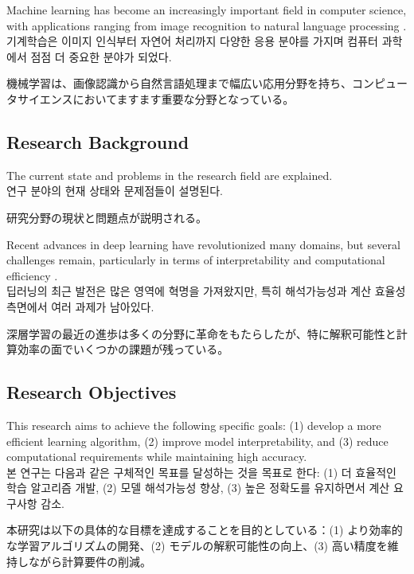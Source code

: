 \documentclass[preprint,12pt]{elsarticle}
\begin{document}
Machine learning has become an increasingly important field in computer science, with applications ranging from image recognition to natural language processing \cite{bishop2006pattern}. \\
기계학습은 이미지 인식부터 자연어 처리까지 다양한 응용 분야를 가지며 컴퓨터 과학에서 점점 더 중요한 분야가 되었다. \\
\begin{CJK}{UTF8}{min}
機械学習は、画像認識から自然言語処理まで幅広い応用分野を持ち、コンピュータサイエンスにおいてますます重要な分野となっている。
\end{CJK}

\subsection{Research Background}
The current state and problems in the research field are explained. \\
연구 분야의 현재 상태와 문제점들이 설명된다. \\
\begin{CJK}{UTF8}{min}
研究分野の現状と問題点が説明される。
\end{CJK}

Recent advances in deep learning have revolutionized many domains, but several challenges remain, particularly in terms of interpretability and computational efficiency \cite{hinton2006fast}. \\
딥러닝의 최근 발전은 많은 영역에 혁명을 가져왔지만, 특히 해석가능성과 계산 효율성 측면에서 여러 과제가 남아있다. \\
\begin{CJK}{UTF8}{min}
深層学習の最近の進歩は多くの分野に革命をもたらしたが、特に解釈可能性と計算効率の面でいくつかの課題が残っている。
\end{CJK}

\subsection{Research Objectives}
This research aims to achieve the following specific goals: (1) develop a more efficient learning algorithm, (2) improve model interpretability, and (3) reduce computational requirements while maintaining high accuracy. \\
본 연구는 다음과 같은 구체적인 목표를 달성하는 것을 목표로 한다: (1) 더 효율적인 학습 알고리즘 개발, (2) 모델 해석가능성 향상, (3) 높은 정확도를 유지하면서 계산 요구사항 감소. \\
\begin{CJK}{UTF8}{min}
本研究は以下の具体的な目標を達成することを目的としている：(1) より効率的な学習アルゴリズムの開発、(2) モデルの解釈可能性の向上、(3) 高い精度を維持しながら計算要件の削減。
\end{CJK}
\end{document}
